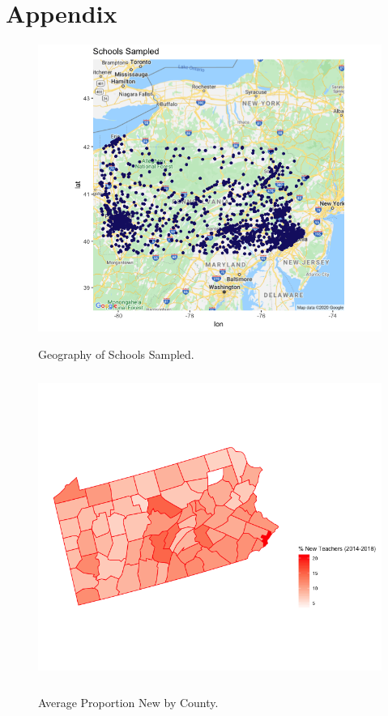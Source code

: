 \documentclass[12pt]{report}
\begin{document}
\clearpage
\section{Appendix}
\normalsize
\begin{figure}[!htb]
    \centering
    \caption{Geography of Schools Sampled.}
    \includegraphics[frame, scale=.7]{school_sample.png}
    \label{fig:my_label}
\end{figure}
\clearpage

\begin{figure}[!htb]
    \centering
    \caption{Average Proportion New by County.}
    \includegraphics[frame, scale=1, height=10cm]{turnover_heatplot.png}
    \label{fig:my_label}
\end{figure}
\clearpage
\end{document}
